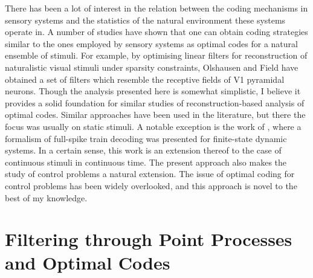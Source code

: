 There has been a lot of interest in the relation between the coding mechanisms in sensory systems and the statistics of the natural environment these systems operate in. A number of
studies have shown that one can obtain coding strategies similar to the ones employed by sensory systems as optimal codes for a natural ensemble of stimuli. For example, by
optimising linear filters for reconstruction of naturalistic visual stimuli under sparsity constraints, Olshausen and Field have obtained a set of filters which resemble the receptive
fields of V1 pyramidal neurons. Though the analysis presented here is somewhat simplistic, I believe it provides a solid foundation for similar studies
of reconstruction-based analysis of optimal codes. Similar approaches have been used in the literature, but there the focus was usually on static stimuli.
A notable exception is the work of , where a formalism of full-spike train decoding was presented for finite-state dynamic systems. In a certain sense,
this work is an extension thereof to the case of continuous stimuli in continuous time. The present approach also makes the study of control problems a natural extension. The
issue of optimal coding for control problems has been widely overlooked, and this approach is novel to the best of my knowledge.\par

\section{Filtering through Point Processes and Optimal Codes}

